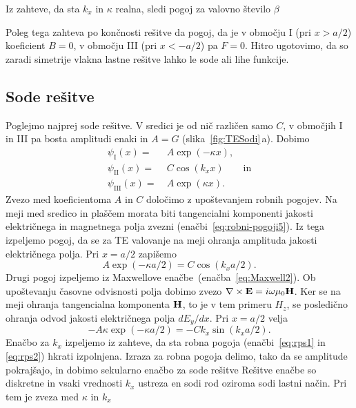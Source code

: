 Iz zahteve, da sta $k_x$ in $\kappa$ realna, sledi pogoj za valovno 
število $\beta$

Poleg tega zahteva po končnosti rešitve da pogoj, da je v območju I 
(pri $x>a/2$) koeficient $B=0$, 
v območju III (pri $x<-a/2$) pa $F=0$. Hitro ugotovimo, da so zaradi 
simetrije vlakna lastne rešitve lahko le sode ali lihe funkcije. 

\subsection*{Sode rešitve}
Poglejmo najprej sode rešitve. V sredici je od nič  različen samo $C$, 
v območjih I in III pa bosta amplitudi enaki in $A = G$ (slika~\ref{fig:TESodi}\,a). 
Dobimo 
\begin{align}
\psi_{\mathrm{I}}(x) =&~ A \exp(-\kappa x), \\
\psi_{\mathrm{II}}(x) =&~ C \cos(k_x x) \qquad \mathrm{in}\\
\psi_{\mathrm{III}}(x) =&~ A \exp(\kappa x).
\end{align}
Zvezo med koeficientoma $A$ in $C$ določimo z upoštevanjem robnih pogojev. Na meji
med sredico in plaščem morata biti tangencialni komponenti 
jakosti električnega in magnetnega polja zvezni (enačbi~\ref{eq:robni-pogoji5}). 
Iz tega izpeljemo pogoj, da se za TE valovanje
na meji ohranja amplituda jakosti električnega polja. Pri $x = a/2$ zapišemo
\begin{equation}
A \exp(-\kappa a/2) = C \cos(k_x a/2).
\label{eq:rps1}
\end{equation}
Drugi pogoj izpeljemo iz Maxwellove enačbe~(enačba~\ref{eq:Maxwell2}). Ob upoštevanju
časovne odvisnosti polja dobimo zvezo $\nabla\times{\bf E}=i\omega\mu_{0}{\bf H}$. 
Ker se na meji ohranja
tangencialna komponenta ${\bf H}$, to je v tem primeru $H_z$, se posledično ohranja 
odvod jakosti električnega polja $dE_y/dx$. 
Pri $x = a/2$  velja
\begin{equation}
-A \kappa \exp(-\kappa a/2) = -C k_x \sin(k_x a/2).
\label{eq:rps2}
\end{equation}
Enačbo za $k_x$ izpeljemo iz zahteve, da sta robna 
pogoja  (enačbi~\ref{eq:rps1} in \ref{eq:rps2}) hkrati izpolnjena. Izraza za robna pogoja delimo, tako da
se amplitude pokrajšajo, in dobimo sekularno 
enačbo za sode rešitve 
Rešitve enačbe so diskretne in vsaki vrednosti $k_x$ ustreza 
en sodi rod oziroma sodi lastni način. Pri tem je zveza med $\kappa$ in $k_x$  

